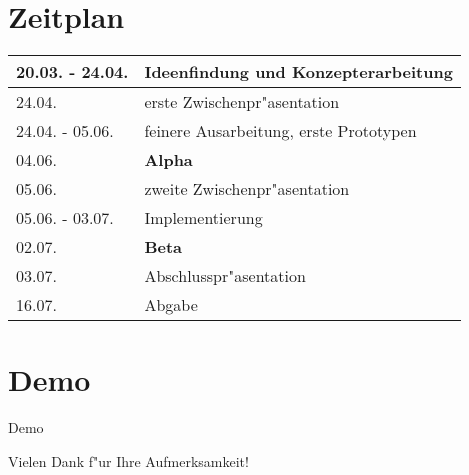 \documentclass[landscape,compress,table]{beamer}
\begin{document}
\section{Zeitplan}
\begin{frame}
	\begin{tabular}{|l|l|}
		\hline
		20.03. - 24.04. & Ideenfindung und Konzepterarbeitung\\
		\hline
		24.04. & erste Zwischenpr"asentation\\
		\hline
		24.04. - 05.06. & feinere Ausarbeitung, erste Prototypen\\
		\hline
		04.06. & \textbf{Alpha}\\
		\hline
		05.06. & zweite Zwischenpr"asentation\\
		\hline
		05.06. - 03.07. & Implementierung\\
		\hline
		02.07. & \textbf{Beta}\\
		\hline
		03.07. & Abschlusspr"asentation\\
		\hline
		16.07. & Abgabe\\
		\hline
	\end{tabular}
\end{frame}

\section{Demo}
\begin{frame}
	\begin{center}
		Demo
	\end{center}
\end{frame}

\begin{frame}
	\begin{center}
		Vielen Dank f"ur Ihre Aufmerksamkeit!
	\end{center}
\end{frame}
\end{document}
